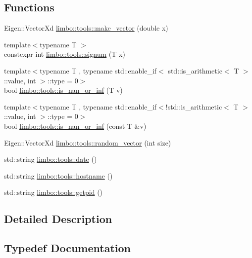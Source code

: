 \subsection*{Functions}
\begin{DoxyCompactItemize}
\item 
Eigen\+::\+Vector\+Xd \hyperlink{group__tools_ga029807776f0b7f44f806e4f9d92e34e7}{limbo\+::tools\+::make\+\_\+vector} (double x)
\item 
{\footnotesize template$<$typename T $>$ }\\constexpr int \hyperlink{group__tools_ga156cca8d927600da93054c952247857b}{limbo\+::tools\+::signum} (T x)
\item 
{\footnotesize template$<$typename T , typename std\+::enable\+\_\+if$<$ std\+::is\+\_\+arithmetic$<$ T $>$\+::value, int $>$\+::type  = 0$>$ }\\bool \hyperlink{group__tools_gabcb0caa2ffabd42fa865c9ab0b624681}{limbo\+::tools\+::is\+\_\+nan\+\_\+or\+\_\+inf} (T v)
\item 
{\footnotesize template$<$typename T , typename std\+::enable\+\_\+if$<$!std\+::is\+\_\+arithmetic$<$ T $>$\+::value, int $>$\+::type  = 0$>$ }\\bool \hyperlink{group__tools_gaf4ca69df04108670f0cc61e4a8ae7367}{limbo\+::tools\+::is\+\_\+nan\+\_\+or\+\_\+inf} (const T \&v)
\item 
Eigen\+::\+Vector\+Xd \hyperlink{group__tools_ga2a64df3120a3ecd84e62640fb43722d0}{limbo\+::tools\+::random\+\_\+vector} (int size)
\item 
std\+::string \hyperlink{group__tools_gafb48d3271e7423f8b8d94599869bd9cb}{limbo\+::tools\+::date} ()
\item 
std\+::string \hyperlink{group__tools_ga4810ffa502d791d6ad750739a953f56f}{limbo\+::tools\+::hostname} ()
\item 
std\+::string \hyperlink{group__tools_ga4ee13d198367d07cabd37316e671db09}{limbo\+::tools\+::getpid} ()
\end{DoxyCompactItemize}


\subsection{Detailed Description}


\subsection{Typedef Documentation}
\hypertarget{group__tools_gab2609bfef1e3bdb8b44c0d6c8c139927}{}
